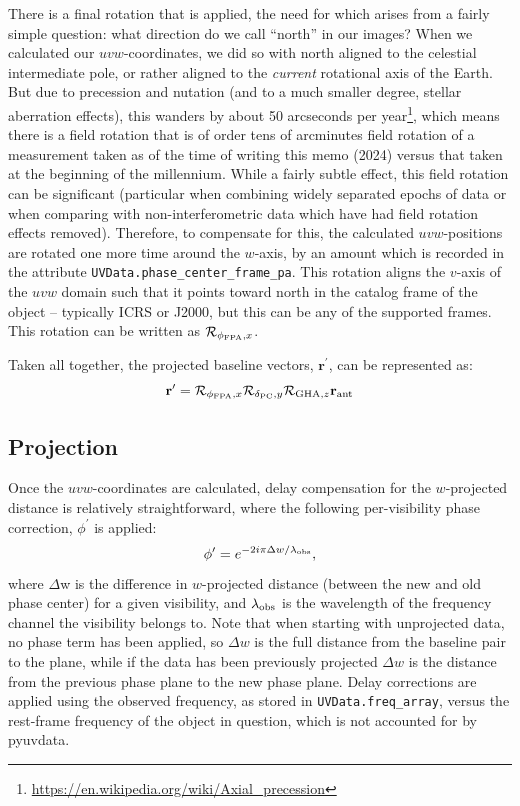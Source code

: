 \documentclass[11pt, oneside]{article}
\begin{document}
There is a final rotation that is applied, the need for which arises from a fairly simple question: what direction do we call ``north'' in our images? When we calculated our $uvw$-coordinates, we did so with north aligned to the celestial intermediate pole, or rather aligned to the \emph{current} rotational axis of the Earth. But due to precession and nutation (and to a much smaller degree, stellar aberration effects), this wanders by about 50 arcseconds per year\footnote{\url{https://en.wikipedia.org/wiki/Axial_precession}}, which means there is a field rotation that is of order tens of arcminutes field rotation of a measurement taken as of the time of writing this memo (2024) versus that taken at the beginning of the millennium. While a fairly subtle effect, this field rotation can be significant (particular when combining widely separated epochs of data or when comparing with non-interferometric data which have had field rotation effects removed).  Therefore, to compensate for this, the calculated $uvw$-positions are rotated one more time around the $w$-axis, by an amount which is recorded in the attribute \texttt{UVData.phase\_center\_frame\_pa}. This rotation aligns the $v$-axis of the $uvw$ domain such that it points toward north in the catalog frame of the object -- typically ICRS or J2000, but this can be any of the supported frames. This rotation can be written as $\mathcal{R}_{\phi_{\rm FPA},x}$.

Taken all together, the projected baseline vectors, $\mathbf{r}^{\prime}$, can be represented as:
\begin{equation}
\mathbf{r}^{\prime} = \mathcal{R}_{\phi_{\rm FPA},x} \mathcal{R}_{\delta_{\rm PC}, y} \mathcal{R}_{\textrm{GHA}, z} \mathbf{r}_{\rm ant}
\end{equation}
\subsection{Projection}\label{ssec:projection}
Once the $uvw$-coordinates are calculated, delay compensation for the $w$-projected distance is relatively straightforward, where the following per-visibility phase correction, $\phi^{\prime}$ is applied:
\begin{equation}\label{eqn:projection}
\phi^{\prime} = e^{-2i\pi\Delta w / \lambda_{\rm obs}},
\end{equation}
where $\Delta$w is the difference in $w$-projected distance (between the new and old phase center) for a given visibility, and $\lambda_{\rm obs}$ is the wavelength of the frequency channel the visibility belongs to. Note that when starting with unprojected data, no phase term has been applied, so $\Delta w$ is the full distance from the baseline pair to the plane, while if the data has been previously projected $\Delta w$ is the distance from the previous phase plane to the new phase plane. Delay corrections are applied using the observed frequency, as stored in \texttt{UVData.freq\_array}, versus the rest-frame frequency of the object in question, which is not accounted for by pyuvdata.
\end{document}
